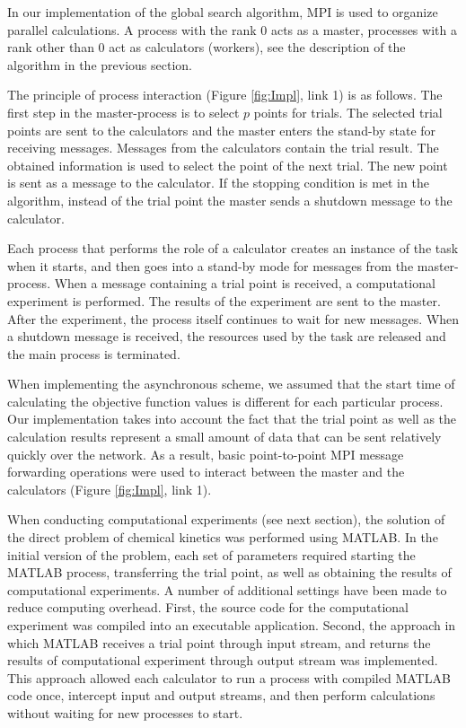 \documentclass[mathematics,article,submit,pdftex,moreauthors]{Definitions/mdpi}
\begin{document}
In our implementation of the global search algorithm, MPI is used to organize parallel calculations. A process with the rank 0 acts as a master, processes with a rank other than 0 act as calculators (workers), see the description of the algorithm in the previous section.

The principle of process interaction (Figure \ref{fig:Impl}, link 1) is as follows. The first step in the master-process is to select $p$ points for trials. The selected trial points are sent to the calculators and the master enters the stand-by state for receiving messages. Messages from the calculators contain the trial result. The obtained information is used to select the point of the next trial. The new point is sent as a message to the calculator. If the stopping condition is met in the algorithm, instead of the trial point the master sends a shutdown message to the calculator.

Each process that performs the role of a calculator creates an instance of the task when it starts, and then goes into a stand-by mode for messages from the master-process. When a message containing a trial point is received, a computational experiment is performed. The results of the experiment are sent to the master. After the experiment, the process itself continues to wait for new messages. When a shutdown message is received, the resources used by the task are released and the main process is terminated.

When implementing the asynchronous scheme, we assumed that the start time of calculating the objective function values is different for each particular process. Our implementation takes into account the fact that the trial point as well as the calculation results represent a small amount of data that can be sent relatively quickly over the network. As a result, basic point-to-point MPI message forwarding operations were used to interact between the master and the calculators (Figure \ref{fig:Impl}, link 1). 

When conducting computational experiments (see next section), the solution of the direct problem of chemical kinetics was performed using MATLAB. In the initial version of the problem, each set of parameters required starting the MATLAB process, transferring the trial point, as well as obtaining the results of computational experiments. A number of additional settings have been made to reduce computing overhead. First, the source code for the computational experiment was compiled into an executable application. Second, the approach in which MATLAB receives a trial point through input stream, and returns the results of computational experiment through output stream was implemented. This approach allowed each calculator to run a process with compiled MATLAB code once, intercept input and output streams, and then perform calculations without waiting for new processes to start. 
\end{document}
